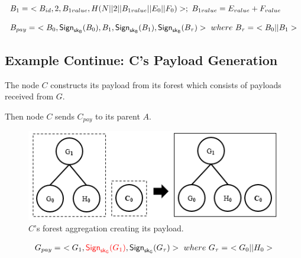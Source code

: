 \documentclass[%
  slidesonly,%
  semlayer%
  ]{seminar}                                  %
\newcommand{\sk}{\sf{sk}}
\begin{document}
\begin{slide}
      
      \begin{equation*}
        \begin{array}{l}
          B_{1} =\ < B_{id}, 2, B_{1value}, H(N||2||B_{1value}||E_{0}||F_{0})>;\ B_{1value} = E_{value} + F_{value}\\
          \\
          B_{pay} =\ < B_{0}, \textsf{Sign}_{\sk_{B}}(B_{0}), B_{1}, \textsf{Sign}_{\sk_{B}}(B_{1}), \textsf{Sign}_{\sk_{B}}(B_{\tau}) >\ where\ B_{\tau} =\ <B_{0} || B_{1}>\\
        \end{array}
        \label{eq:b-payload}
      \end{equation*}


      \clearpage
    
    \subsection*{Example Continue: C's Payload Generation}  
      The node $C$ constructs its payload from its forest which consists of payloads received from $G$.

      Then node $C$ sends $C_{pay}$ to its parent $A$.

      \begin{figure}[h!]
        \centering
        \includegraphics[scale = 0.5]{images/c-forest-payload.png}
        \caption{$C$'s forest aggregation creating its payload.}
        \label{fig:c-forest-payload}
      \end{figure}
      \begin{equation*}
        \begin{array}{l}
          G_{pay} =\ <G_{1},\textcolor{red}{\textsf{Sign}_{\sk_{G}}(G_{1})}, \textsf{Sign}_{\sk_{G}}(G_{\tau})>\ where\ G_{\tau} =\ <G_{0} || H_{0}>\\
        \end{array}
      \end{equation*}
      

\end{slide}
\end{document}
